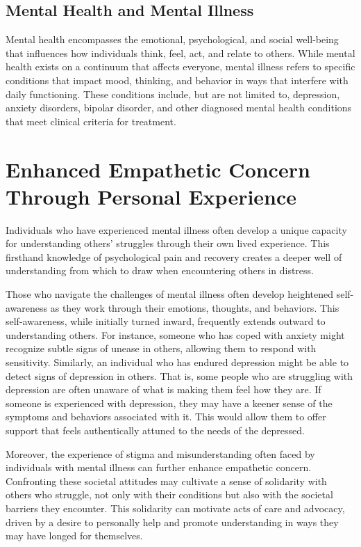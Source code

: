 \documentclass[stu]{apa7}
\begin{document}
\subsection{Mental Health and Mental Illness}

Mental health encompasses the emotional, psychological, and social well-being that influences how individuals think, feel, act, and relate to others. While mental health exists on a continuum that affects everyone, mental illness refers to specific conditions that impact mood, thinking, and behavior in ways that interfere with daily functioning. These conditions include, but are not limited to, depression, anxiety disorders, bipolar disorder, and other diagnosed mental health conditions that meet clinical criteria for treatment.

\section{Enhanced Empathetic Concern Through Personal Experience}

Individuals who have experienced mental illness often develop a unique capacity for understanding others' struggles through their own lived experience. This firsthand knowledge of psychological pain and recovery creates a deeper well of understanding from which to draw when encountering others in distress.

Those who navigate the challenges of mental illness often develop heightened self-awareness as they work through their emotions, thoughts, and behaviors. This self-awareness, while initially turned inward, frequently extends outward to understanding others. For instance, someone who has coped with anxiety might recognize subtle signs of unease in others, allowing them to respond with sensitivity. Similarly, an individual who has endured depression might be able to detect signs of depression in others. That is, some people who are struggling with depression are often unaware of what is making them feel how they are. If someone is experienced with depression, they may have a keener sense of the symptoms and behaviors associated with it. This would allow them to offer support that feels authentically attuned to the needs of the depressed.

Moreover, the experience of stigma and misunderstanding often faced by individuals with mental illness can further enhance empathetic concern. Confronting these societal attitudes may cultivate a sense of solidarity with others who struggle, not only with their conditions but also with the societal barriers they encounter. This solidarity can motivate acts of care and advocacy, driven by a desire to personally help and promote understanding in ways they may have longed for themselves.
\end{document}

